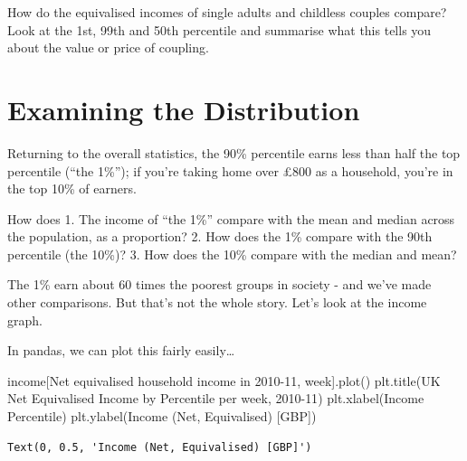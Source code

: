 \documentclass[
  letterpaper,
  DIV=11,
  numbers=noendperiod]{scrreprt}
\newenvironment{Shaded}{\begin{snugshade}}{\end{snugshade}}
\newcommand{\NormalTok}[1]{\textcolor[rgb]{0.00,0.23,0.31}{#1}}
\newcommand{\StringTok}[1]{\textcolor[rgb]{0.13,0.47,0.30}{#1}}
\begin{document}
How do the equivalised incomes of single adults and childless couples
compare? Look at the 1st, 99th and 50th percentile and summarise what
this tells you about the value or price of coupling.

\hypertarget{examining-the-distribution}{%
\section{Examining the Distribution}\label{examining-the-distribution}}

Returning to the overall statistics, the 90\% percentile earns less than
half the top percentile (``the 1\%''); if you're taking home over £800
as a household, you're in the top 10\% of earners.

How does 1. The income of ``the 1\%'' compare with the mean and median
across the population, as a proportion? 2. How does the 1\% compare with
the 90th percentile (the 10\%)? 3. How does the 10\% compare with the
median and mean?

The 1\% earn about 60 times the poorest groups in society - and we've
made other comparisons. But that's not the whole story. Let's look at
the income graph.

In pandas, we can plot this fairly easily\ldots{}

\begin{Shaded}
\begin{Highlighting}[]
\NormalTok{income[}\StringTok{\textquotesingle{}Net equivalised household income in 2010{-}11, week\textquotesingle{}}\NormalTok{].plot()}
\NormalTok{plt.title(}\StringTok{\textquotesingle{}UK Net Equivalised Income by Percentile per week, 2010{-}11\textquotesingle{}}\NormalTok{)}
\NormalTok{plt.xlabel(}\StringTok{\textquotesingle{}Income Percentile\textquotesingle{}}\NormalTok{)}
\NormalTok{plt.ylabel(}\StringTok{\textquotesingle{}Income (Net, Equivalised) [GBP]\textquotesingle{}}\NormalTok{)}
\end{Highlighting}
\end{Shaded}

\begin{verbatim}
Text(0, 0.5, 'Income (Net, Equivalised) [GBP]')
\end{verbatim}
\end{document}
